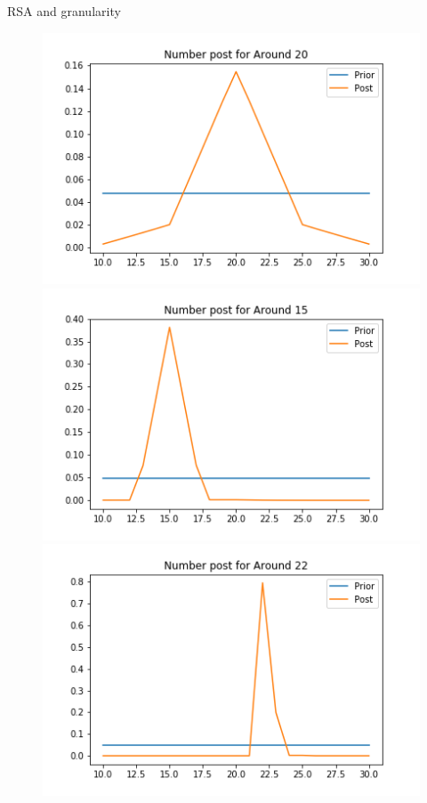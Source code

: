 \documentclass[xcolor=table, hyperref={pdfpagelabels=false}]{beamer}
\begin{document}
\begin{frame}{RSA and granularity}
\begin{minipage}{.4\textwidth}
	\begin{figure}
		\includegraphics[width=.8\textwidth]{./images/number_post_around_20.png}
		\includegraphics[width=.8\textwidth]{./images/number_post_around_15.png}
		\includegraphics[width=.8\textwidth]{./images/number_post_around_22.png}
	\end{figure}
\end{minipage}
\begin{minipage}{.55\textwidth}

\end{minipage}
\end{frame}
\end{document}
